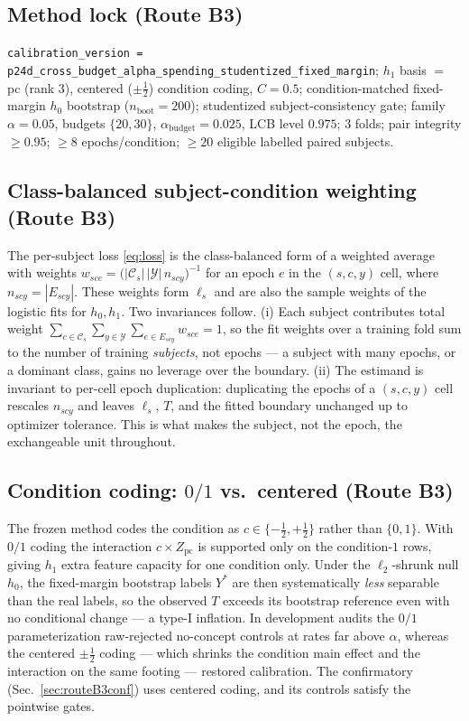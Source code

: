 \subsection{Method lock (Route B3)}
\texttt{calibration\_version = p24d\_cross\_budget\_alpha\_spending\_studentized\_fixed\_margin};
$h_1$ basis $=$ pc (rank $3$), centered ($\pm\tfrac12$) condition coding, $C=0.5$; condition-matched
fixed-margin $h_0$ bootstrap ($n_{\text{boot}}=200$); studentized subject-consistency gate; family
$\alpha=0.05$, budgets $\{20,30\}$, $\alpha_{\text{budget}}=0.025$, LCB level $0.975$; $3$ folds; pair
integrity $\geq 0.95$; $\geq 8$ epochs/condition; $\geq 20$ eligible labelled paired subjects.

\subsection{Class-balanced subject-condition weighting (Route B3)}
\label{app:weighting}
The per-subject loss \eqref{eq:loss} is the class-balanced form of a weighted average with weights
$w_{sce}=\bigl(|\mathcal{C}_s|\,|\mathcal{Y}|\,n_{scy}\bigr)^{-1}$ for an epoch $e$ in the $(s,c,y)$ cell,
where $n_{scy}=|E_{scy}|$. These weights form $\ell_s$ and are also the sample weights of the logistic fits
for $h_0,h_1$. Two invariances follow. (i) Each subject contributes total weight
$\sum_{c\in\mathcal{C}_s}\sum_{y\in\mathcal{Y}}\sum_{e\in E_{scy}} w_{sce}=1$, so the fit weights over a
training fold sum to the number of training \emph{subjects}, not epochs --- a subject with many epochs, or a
dominant class, gains no leverage over the boundary. (ii) The estimand is invariant to per-cell epoch
duplication: duplicating the epochs of a $(s,c,y)$ cell rescales $n_{scy}$ and leaves $\ell_s$, $T$, and the
fitted boundary unchanged up to optimizer tolerance. This is what makes the subject, not the epoch, the
exchangeable unit throughout.

\subsection{Condition coding: $0/1$ vs.\ centered (Route B3)}
\label{app:coding}
The frozen method codes the condition as $c\in\{-\tfrac12,+\tfrac12\}$ rather than $\{0,1\}$. With $0/1$
coding the interaction $c\times Z_{\mathrm{pc}}$ is supported only on the condition-$1$ rows, giving $h_1$
extra feature capacity for one condition only. Under the $\ell_2$-shrunk null $h_0$, the fixed-margin
bootstrap labels $Y^\ast$ are then systematically \emph{less} separable than the real labels, so the observed
$T$ exceeds its bootstrap reference even with no conditional change --- a type-I inflation. In development
audits the $0/1$ parameterization raw-rejected no-concept controls at rates far above $\alpha$, whereas the
centered $\pm\tfrac12$ coding --- which shrinks the condition main effect and the interaction on the same
footing --- restored calibration. The confirmatory (Sec.~\ref{sec:routeB3conf}) uses centered coding, and its
controls satisfy the pointwise gates.

